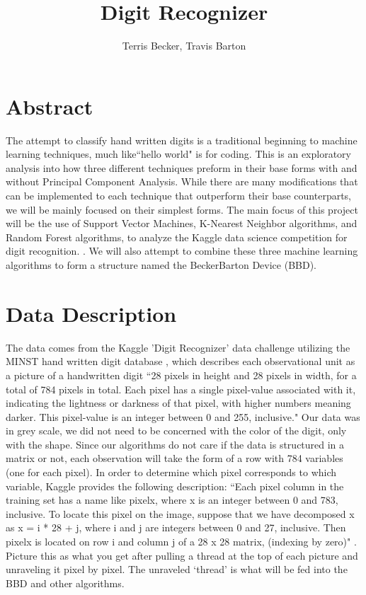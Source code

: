 \documentclass[11pt, oneside]{article}   	%
\title{Digit Recognizer}
\author{Terris Becker, Travis Barton}
\begin{document}
\maketitle
\section{Abstract}
The attempt to classify hand written digits is a traditional beginning to machine learning techniques, much like``hello world" is for coding. This is an exploratory analysis into how three different techniques preform in their base forms with and without Principal Component Analysis. While there are many modifications that can be implemented to each technique that outperform their base counterparts, we will be mainly focused on their simplest forms. The main focus of this project will be the use of Support Vector Machines, K-Nearest Neighbor algorithms, and Random Forest algorithms, to analyze the Kaggle data science competition for digit recognition. \cite{kagglechallange}. We will also attempt to combine these three machine learning algorithms to form a structure named the BeckerBarton Device (BBD). 

\section{Data Description}
The data comes from the Kaggle 'Digit Recognizer' data challenge utilizing the MINST hand written digit database \cite{kaggledata}, which describes each observational unit as a picture of a handwritten digit ``28 pixels in height and 28 pixels in width, for a total of 784 pixels in total. Each pixel has a single pixel-value associated with it, indicating the lightness or darkness of that pixel, with higher numbers meaning darker. This pixel-value is an integer between 0 and 255, inclusive." Our data was in grey scale, we did not need to be concerned with the color of the digit, only with the shape.
Since our algorithms do not care if the data is structured in a matrix or not, each observation will take the form of a row with 784 variables (one for each pixel). In order to determine which pixel corresponds to which variable, Kaggle provides the following description: ``Each pixel column in the training set has a name like pixelx, where x is an integer between 0 and 783, inclusive. To locate this pixel on the image, suppose that we have decomposed x as x = i * 28 + j, where i and j are integers between 0 and 27, inclusive. Then pixelx is located on row i and column j of a 28 x 28 matrix, (indexing by zero)" \cite{kaggledata}. Picture this as what you get after pulling a thread at the top of each picture and unraveling it pixel by pixel. The unraveled `thread' is what will be fed into the BBD and other algorithms.
\end{document}
